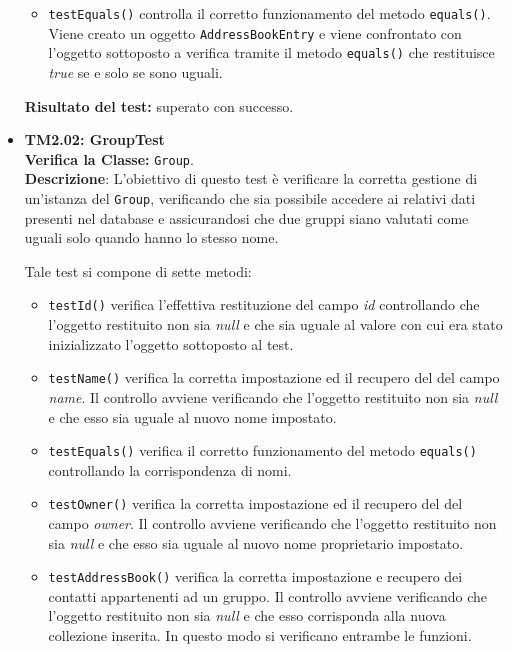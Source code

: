 \begin{itemize}
\begin{itemize}
\item\texttt{testEquals()} controlla  il corretto funzionamento del metodo \texttt{equals()}. Viene creato un oggetto \texttt{AddressBookEntry} e viene confrontato con l'oggetto sottoposto a verifica tramite il metodo \texttt{equals()} che restituisce \textit{true} se e solo se sono uguali.
\end{itemize}
\textbf{Risultato del test:} superato con successo.

\item \textbf{TM2.02: GroupTest}\\
\textbf{Verifica la Classe:} \texttt{Group}.\\
\textbf{Descrizione}: L'obiettivo di questo test è verificare la corretta gestione di un'istanza del  \texttt{Group}, verificando che sia possibile accedere ai relativi dati presenti nel database e assicurandosi che due gruppi siano valutati come uguali solo quando hanno lo stesso nome.

Tale test si compone di sette metodi:
\begin{itemize}

\item \texttt{testId()} verifica l'effettiva restituzione del campo \textit{id} controllando che l'oggetto restituito non sia \textit{null} e che sia uguale al valore con cui era stato inizializzato l'oggetto sottoposto al test.

\item \texttt{testName()}
verifica la corretta impostazione ed il recupero del del campo \textit{name}. Il controllo avviene verificando che l'oggetto restituito non sia \textit{null} e che esso sia uguale al nuovo nome impostato. 

\item \texttt{testEquals()} 
verifica il corretto funzionamento del metodo \texttt{equals()} controllando la corrispondenza di nomi. 

\item \texttt{testOwner()} verifica la corretta impostazione ed il recupero del del campo \textit{owner}. Il controllo avviene verificando che l'oggetto restituito non sia \textit{null} e che esso sia uguale al nuovo nome proprietario impostato. 

\item \texttt{testAddressBook()} verifica la corretta impostazione e recupero dei contatti appartenenti ad un gruppo.
Il controllo avviene verificando che l'oggetto restituito non sia \textit{null} e che esso corrisponda alla nuova collezione inserita.
In questo modo si verificano entrambe le funzioni.


\end{itemize}
\end{itemize}
